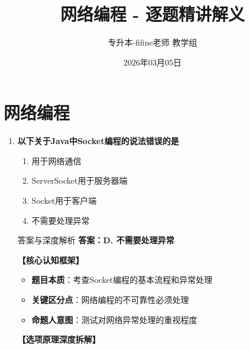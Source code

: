 \documentclass[12pt, a4paper]{ctexart}
\title{\textcolor{myblue}{\textbf{网络编程 - 逐题精讲解义}}}
\author{专升本-fifine老师 教学组}
\date{2026年03月05日}
\begin{document}
\maketitle
\thispagestyle{empty}
\newpage

\section{网络编程}

\begin{enumerate}[label=\textbf{\arabic*.}]

	\item \textbf{以下关于Java中Socket编程的说法错误的是}
	      \begin{enumerate}[label=\Alph*.]
		      \item 用于网络通信
		      \item ServerSocket用于服务器端
		      \item Socket用于客户端
		      \item 不需要处理异常
	      \end{enumerate}

	      \begin{bluebox}{答案与深度解析}
		      \textbf{答案：D. 不需要处理异常}

		      \textbf{【核心认知框架】}
		      \begin{itemize}[label={}, leftmargin=*, nosep]
			      \item \textbf{题目本质}：考查Socket编程的基本流程和异常处理
			      \item \textbf{关键区分点}：网络编程的不可靠性必须处理
			      \item \textbf{命题人意图}：测试对网络异常处理的重视程度
		      \end{itemize}

		      \textbf{【选项原理深度拆解】}


\end{bluebox}
\end{enumerate}
\end{document}
